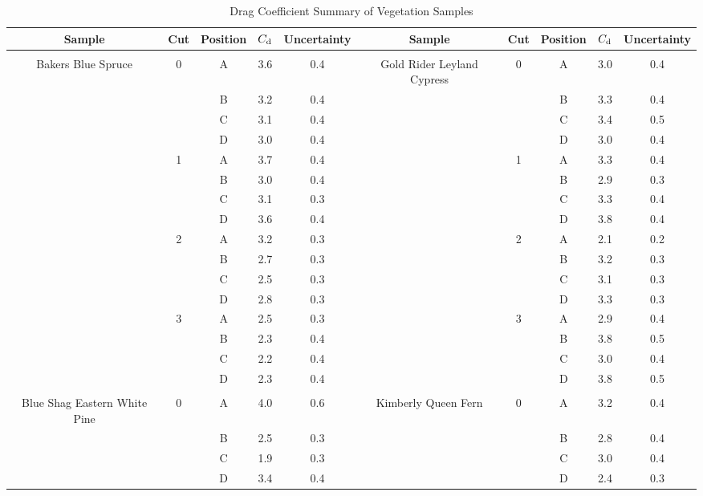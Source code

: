 \documentclass[12pt]{article}
\begin{document}
\begin{table}
\caption{Drag Coefficient Summary of Vegetation Samples}
\label{tab:SumTable}
\centering

	\footnotesize
	\begin{tabular}{cccccccccc}	
			\hline
\textbf{Sample}		&	\textbf{Cut}	&\textbf{Position}& $C_{\rm d}$ 	&\textbf{Uncertainty}	&\textbf{Sample}	&	\textbf{Cut}	&\textbf{Position}& 	\textbf{$C_{\rm d}$ }&\textbf{Uncertainty}\\
\hline
\\[0.05cm]
Bakers Blue Spruce			&	0	&	A	& 	3.6	&	0.4				&Gold Rider Leyland Cypress&	0	&	A	& 	3.0	&	0.4	\\
					&		&	B	& 	3.2	&	0.4				&				&		&	B	& 	3.3	&	0.4	\\
					&		&	C	& 	3.1	&	0.4				&				&		&	C	& 	3.4	&	0.5	\\
					&		&	D	& 	3.0	&	0.4				&				&		&	D	& 	3.0	&	0.4	\\
					&	1	&	A	& 	3.7	&	0.4				&				&	1	&	A	& 	3.3	&	0.4	\\
					&		&	B	& 	3.0	&	0.4				&				&		&	B	& 	2.9	&	0.3	\\
					&		&	C	& 	3.1	&	0.3				&				&		&	C	& 	3.3	&	0.4	\\
					&		&	D	& 	3.6	&	0.4				&				&		&	D	& 	3.8	&	0.4	\\
					&	2	&	A	& 	3.2	&	0.3				&				&	2	&	A	& 	2.1	&	0.2	\\
					&		&	B	& 	2.7	&	0.3				&				&		&	B	& 	3.2	&	0.3	\\
					&		&	C	& 	2.5	&	0.3				&				&		&	C	& 	3.1	&	0.3	\\
					&		&	D	& 	2.8	&	0.3				&				&		&	D	& 	3.3	&	0.3	\\
					&	3	&	A	& 	2.5	&	0.3				&				&	3	&	A	& 	2.9	&	0.4	\\
					&		&	B	& 	2.3	&	0.4				&				&		&	B	& 	3.8	&	0.5	\\
					&		&	C	& 	2.2	&	0.4				&				&		&	C	& 	3.0	&	0.4	\\
					&		&	D	& 	2.3	&	0.4				&				&		&	D	& 	3.8	&	0.5	\\
					&		&		& 		&					&				&		&		& 		&		\\
Blue Shag Eastern White Pine	&	0	&	A	& 	4.0	&	0.6				&Kimberly Queen Fern	&	0	&	A	& 	3.2	&	0.4	\\
					&		&	B	& 	2.5	&	0.3				&				&		&	B	& 	2.8	&	0.4	\\	
					&		&	C	& 	1.9	&	0.3				&				&		&	C	& 	3.0	&	0.4	\\
					&		&	D	& 	3.4	&	0.4				&				&		&	D	& 	2.4	&	0.3	\\

\end{tabular}
\end{table}
\end{document}
